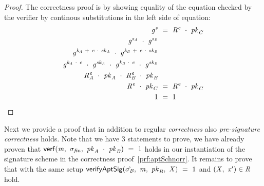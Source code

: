 \begin{proof}
    \label{prf:aptSchnorr}
    The correctness proof is by showing equality of the equation checked by the verifier by continous substitutions in the left side of equation:
    \begin{align}
        \mathit{g}^{\mathit{s}} &~=~ \mathit{R}^{\mathit{e}} ~\cdot~ \mathit{pk}_{\mathit{C}} \\
        \mathit{g}^{\mathit{s}_{\mathit{A}}} ~\cdot~ \mathit{g}^{\mathit{s}_{\mathit{B}}} & \\
        \mathit{g}^{\mathit{\mathit{k}_{\mathit{A}}} ~+~ \mathit{e} ~\cdot~ \mathit{sk}_{\mathit{A}}} ~\cdot~ \mathit{g}^{\mathit{\mathit{k}_{\mathit{B}}} ~+~ \mathit{e} ~\cdot~ \mathit{sk}_{\mathit{B}}} & \\
        \mathit{g}^{\mathit{\mathit{k}_{\mathit{A}}} ~\cdot~ \mathit{e}} ~\cdot~ \mathit{g}^{\mathit{sk}_{\mathit{A}}} ~\cdot~ \mathit{g}^{\mathit{\mathit{k}_{\mathit{B}}} ~\cdot~ \mathit{e}} ~\cdot~ \mathit{g}^{\mathit{sk}_{\mathit{B}}} & \\
        \mathit{R}_{\mathit{A}}^{\mathit{e}} ~\cdot~ \mathit{pk}_{\mathit{A}} ~\cdot~ \mathit{R}_{\mathit{B}}^{\mathit{e}} ~\cdot~ \mathit{pk}_{\mathit{B}} & \\
        \mathit{R}^{\mathit{e}} ~\cdot~ \mathit{pk}_{\mathit{C}} & ~=~ \mathit{R}^{\mathit{e}} ~\cdot~ \mathit{pk}_{\mathit{C}} \\
        1 & ~=~ 1
    \end{align}
\end{proof}

Next we provide a proof that in addition to regular \textit{correctness} also \textit{pre-signature correctness} holds.
Note that we have 3 statements to prove, we have already proven that $\mathsf{verf}(\mathit{m} ,~ \sigma_{\mathit{fin}} ,~ \mathit{pk}_{\mathit{A}} ~\cdot~ \mathit{pk}_{\mathit{B}}) ~=~ 1$ holds in our instantiation of the signature scheme in the
correctness proof~\ref{prf:aptSchnorr}.
It remains to prove that with the same setup $\mathsf{verifyAptSig}(\hat{\sigma_{\mathit{B}}} ,~ \mathit{m} ,~ \mathit{pk}_{\mathit{B}} ,~ \mathit{X}) ~=~ 1$ and
$(\mathit{X} ,~ \mathit{x}') \in \mathit{R}$ hold.

